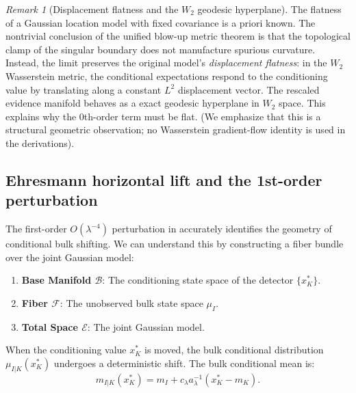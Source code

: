 \documentclass[11pt]{amsart}
\theoremstyle{plain}
\theoremstyle{definition}
\theoremstyle{remark}
\newtheorem{remark}[theorem]{Remark}
\begin{document}
    \begin{remark}[Displacement flatness and the $W_2$ geodesic hyperplane]
        \label{rem:w2_hyperplane}
        The flatness of a Gaussian location model with fixed covariance is a priori known. The nontrivial conclusion of the unified blow-up metric theorem is that the topological clamp of the singular boundary does not manufacture spurious curvature. Instead, the limit preserves the original model's \emph{displacement flatness}: in the $W_2$ Wasserstein metric, the conditional expectations respond to the conditioning value by translating along a constant $L^2$ displacement vector. The rescaled evidence manifold behaves as a exact geodesic hyperplane in $W_2$ space. This explains why the 0th-order term must be flat. (We emphasize that this is a structural geometric observation; no Wasserstein gradient-flow identity is used in the derivations).
    \end{remark}

    \subsection{Ehresmann horizontal lift and the 1st-order perturbation}

    The first-order $O(\lambda^{-4})$ perturbation in  accurately identifies the geometry of conditional bulk shifting. We can understand this by constructing a fiber bundle over the joint Gaussian model:
    \begin{enumerate}
        \item \textbf{Base Manifold $\mathcal{B}$}: The conditioning state space of the detector $\{x_K^*\}$.
        \item \textbf{Fiber $\mathcal{F}$}: The unobserved bulk state space $\mu_I$.
        \item \textbf{Total Space $\mathcal{E}$}: The joint Gaussian model.
    \end{enumerate}

    When the conditioning value $x_K^*$ is moved, the bulk conditional distribution $\mu_{I|K}(x_K^*)$ undergoes a deterministic shift. The bulk conditional mean is:
    \begin{equation}
        m_{I|K}(x_K^*) = m_I + c_\lambda a_\lambda^{-1}(x_K^* - m_K).
    \end{equation}
\end{document}
